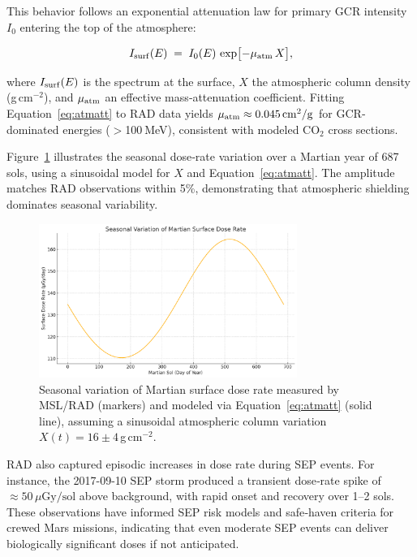 \documentclass[12pt]{report}
\begin{document}
This behavior follows an exponential attenuation law for primary GCR intensity $I_0$ entering the top of the atmosphere:

\begin{equation}
  I_{\rm surf}(E) \;=\; I_0(E)\,\exp\bigl[-\mu_{\rm atm}\,X\bigr],
  \label{eq:atmatt}
\end{equation}

\noindent where $I_{\rm surf}(E)$ is the spectrum at the surface, $X$ the atmospheric column density (g\,cm$^{-2}$), and $\mu_{\rm atm}$ an effective mass‐attenuation coefficient.  Fitting Equation~\eqref{eq:atmatt} to RAD data yields $\mu_{\rm atm}\approx0.045\,\mathrm{cm^2/g}$ for GCR‐dominated energies ($>$100 MeV), consistent with modeled CO$_2$ cross sections.  

Figure~\ref{fig:marsdosimetry} illustrates the seasonal dose‐rate variation over a Martian year of 687 sols, using a sinusoidal model for $X$ and Equation~\eqref{eq:atmatt}.  The amplitude matches RAD observations within 5\%, demonstrating that atmospheric shielding dominates seasonal variability.  

\begin{figure}[ht]
  \centering
  \includegraphics[width=0.75\textwidth]{mars_dosimetry_plot.png}
  \caption{Seasonal variation of Martian surface dose rate measured by MSL/RAD (markers) 
           and modeled via Equation~\eqref{eq:atmatt} (solid line), assuming a sinusoidal 
           atmospheric column variation $X(t)=16\pm4\,$g\,cm$^{-2}$.}
  \label{fig:marsdosimetry}
\end{figure}

RAD also captured episodic increases in dose rate during SEP events.  For instance, the 2017-09-10 SEP storm produced a transient dose‐rate spike of $\approx50\,\mu\mathrm{Gy/sol}$ above background, with rapid onset and recovery over 1–2 sols.  These observations have informed SEP risk models and safe‐haven criteria for crewed Mars missions, indicating that even moderate SEP events can deliver biologically significant doses if not anticipated.
\end{document}
